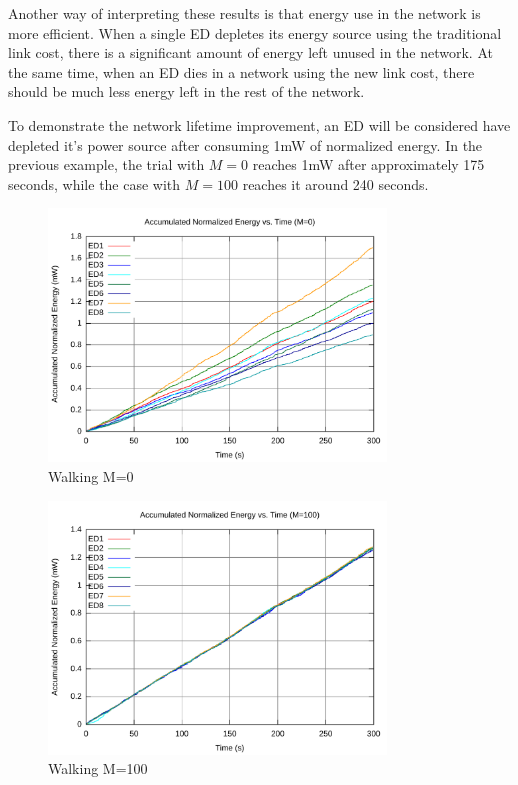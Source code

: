 \documentclass{article}
\begin{document}
Another way of interpreting these results is that energy use in the network is more efficient. When a single ED depletes its energy source using the traditional link cost, there is a significant amount of energy left unused in the network. At the same time, when an ED dies in a network using the new link cost, there should be much less energy left in the rest of the network.

To demonstrate the network lifetime improvement, an ED will be considered have depleted it's power source after consuming 1mW of normalized energy. In the previous example, the trial with $M=0$ reaches 1mW after approximately 175 seconds, while the case with $M=100$ reaches it around 240 seconds.

\begin{figure}[!ht]
\includegraphics[width=0.8\textwidth]{figures/walk2-c0.pdf}
\caption{Walking M=0}
\label{fig:walk2-c0}
\end{figure}

\begin{figure}[!ht]
\includegraphics[width=0.8\textwidth]{figures/walk2-c100.pdf}
\caption{Walking M=100}
\label{fig:walk2-c100}
\end{figure}
\end{document}

